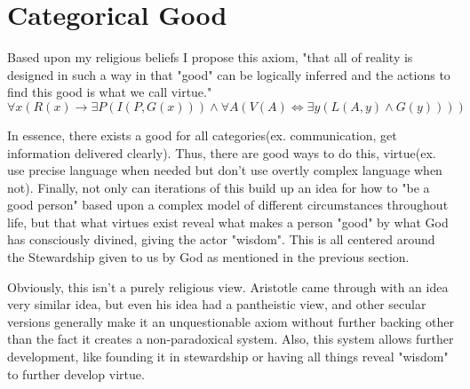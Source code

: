 \section{Categorical Good}
\par Based upon my religious beliefs I propose this axiom, "that all of reality is designed in such a way in that "good" can be logically inferred and the actions to find this good is what we call virtue." 
$$\forall x( R(x)\rightarrow \exists P(I(P,G(x))) \land \forall A(V(A)  \iff \exists y(L(A, y) \land G(y))))$$
\par In essence, there exists a good for all categories(ex. communication, get information delivered clearly). Thus, there are good ways to do this, virtue(ex. use precise language when needed but don't use overtly complex language when not). Finally, not only can iterations of this build up an idea for how to "be a good person" based upon a complex model of different circumstances throughout life, but that what virtues exist reveal what makes a person "good" by what God has consciously divined, giving the actor "wisdom". This is all centered around the Stewardship given to us by God as mentioned in the previous section.
\par Obviously, this isn't a purely religious view. Aristotle came through with an idea very similar idea, but even his idea had a pantheistic view, and other secular versions generally make it an unquestionable axiom without further backing other than the fact it creates a non-paradoxical system. Also, this system allows further development, like founding it in stewardship or having all things reveal "wisdom" to further develop virtue.

